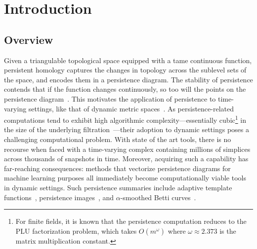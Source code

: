\documentclass[sn-mathphys]{sn-jnl}
\begin{document}
\maketitle

\section{Introduction} 
\subsection{Overview}\label{sec:overview} 
Given a triangulable topological space equipped with a tame continuous function, persistent homology captures the changes in topology across the sublevel sets of the space, and encodes them in a persistence diagram. The stability of persistence contends that   if the function changes continuously, so too will the points on the persistence diagram~\cite{cohen2007stability, cohen2006vines}. 
This motivates the  application of persistence to time-varying  settings, like that of dynamic metric spaces~\cite{kim2020spatiotemporal}. 
As persistence-related computations tend to exhibit high algorithmic complexity---essentially cubic\footnote{For finite fields, it is known that the persistence computation reduces to the PLU factorization problem, which takes $O(m^\omega)$ where $\omega \approx 2.373$ is the matrix multiplication constant.} in the size of the underlying filtration~\cite{morozov2005persistence}---their adoption to dynamic settings poses a challenging computational problem.
With state of the art tools, there is no recourse when faced with a time-varying complex containing millions of simplices across thousands of snapshots in time.
Moreover, acquiring such a capability has far-reaching consequences: methods that vectorize persistence diagrams for machine learning purposes all immediately become computationally viable tools in dynamic settings. Such persistence summaries include adaptive template functions~\cite{polanco2019adaptive}, persistence images~\cite{adams2017persistence}, and $\alpha$-smoothed Betti curves~\cite{ulmer2019topological}. 
  
\end{document}
